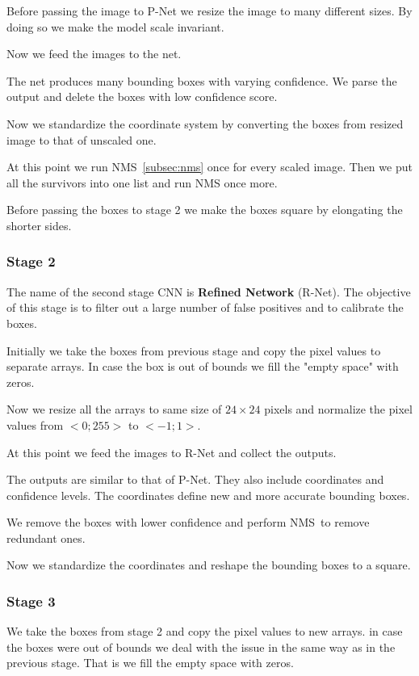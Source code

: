 Before passing the image to P-Net we resize the image to many different sizes.
By doing so we make the model scale invariant.

Now we feed the images to the net.

The net produces many bounding boxes with varying confidence.
We parse the output and delete the boxes with low confidence score.

Now we standardize the coordinate system by converting the boxes from resized image to that of unscaled one.

At this point we run NMS~\ref{subsec:nms} once for every scaled image.
Then we put all the survivors into one list and run NMS once more.

Before passing the boxes to stage 2 we make the boxes square by elongating the shorter sides.

\subsubsection{Stage 2}
The name of the second stage CNN is \textbf{Refined Network} (R-Net).
The objective of this stage is to filter out a large number of false positives and to calibrate the boxes.

Initially we take the boxes from previous stage and copy the pixel values to separate arrays.
In case the box is out of bounds we fill the "empty space" with zeros.

Now we resize all the arrays to same size of $24 \times 24$ pixels and normalize the pixel values from $<0; 255>$ to
$<-1; 1>$.

At this point we feed the images to R-Net and collect the outputs.

The outputs are similar to that of P-Net.
They also include coordinates and confidence levels.
The coordinates define new and more accurate bounding boxes.

We remove the boxes with lower confidence and perform NMS to remove redundant ones.

Now we standardize the coordinates and reshape the bounding boxes to a square.

\subsubsection{Stage 3}
We take the boxes from stage 2 and copy the pixel values to new arrays.
in case the boxes were out of bounds we deal with the issue in the same way as in the previous stage.
That is we fill the empty space with zeros.

